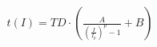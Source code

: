 \documentclass[preview]{standalone}
\begin{document}
\begin{align*}
t(I) = TD \cdot \left( \frac{A}{\left(\frac{I}{I_p}\right)^p - 1} + B \right)
\end{align*}
\end{document}
